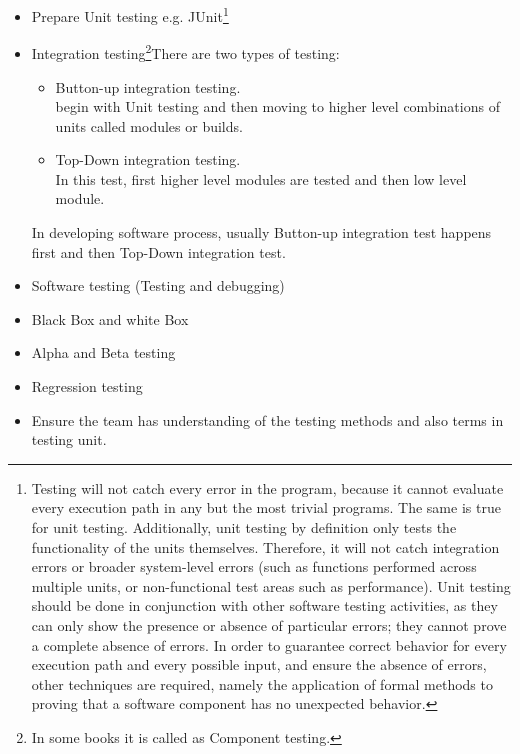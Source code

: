 \documentclass{article}
\begin{document}
\begin{itemize}
 \item Prepare Unit testing e.g. JUnit\footnote{Testing will not catch every error in the program, because it cannot evaluate every execution path in any but the most trivial programs. The same is true for unit testing. Additionally, unit testing by definition only tests the functionality of the units themselves. Therefore, it will not catch integration errors or broader system-level errors (such as functions performed across multiple units, or non-functional test areas such as performance). Unit testing should be done in conjunction with other software testing activities, as they can only show the presence or absence of particular errors; they cannot prove a complete absence of errors. In order to guarantee correct behavior for every execution path and every possible input, and ensure the absence of errors, other techniques are required, namely the application of formal methods to proving that a software component has no unexpected behavior.
}
 \item Integration testing\footnote{In some books it is called as Component testing.}There are two types of testing:
\begin{itemize}
\item Button-up integration testing. \\
begin with Unit testing and then moving to higher level combinations of units called modules or builds.
\item Top-Down integration testing.\\
In this test, first higher level modules are tested and then low level module. 
\end{itemize}
In developing software process, usually Button-up integration test happens first and then Top-Down integration test.~\cite{sommerville2009software}

 \item Software testing (Testing and debugging)
 \item Black Box and white Box
 \item Alpha and Beta testing
 \item Regression testing
 \item Ensure the team has understanding of the testing methods and also terms in testing unit. 
\end{itemize}

\begin{comment}
Software testing is a combinatorial problem. For example, every boolean decision statement requires at least two tests: one with an outcome of "true" and one with an outcome of "false". As a result, for every line of code written, programmers often need 3 to 5 lines of test code.\cite{myers2011art} This obviously takes time and its investment may not be worth the effort. There are also many problems that cannot easily be tested at all – for example those that are nondeterministic or involve multiple threads. In addition, code for a unit test is likely to be at least as buggy as the code it is testing. 
\end{comment}
\end{document}
